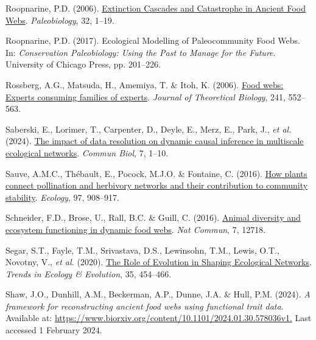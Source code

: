 \documentclass[
]{article}
\newlength{\cslhangindent}
\newenvironment{CSLReferences}[2] %
 {\begin{list}{}{%
  \setlength{\itemindent}{0pt}
  \setlength{\leftmargin}{0pt}
  \setlength{\parsep}{0pt}
  \ifodd #1
   \setlength{\leftmargin}{\cslhangindent}
   \setlength{\itemindent}{-1\cslhangindent}
  \fi
  \setlength{\itemsep}{#2\baselineskip}}}
 {\end{list}}
\begin{document}
\begin{CSLReferences}{1}{0}
Roopnarine, P.D. (2006).
\href{https://www.jstor.org/stable/4096814}{Extinction {Cascades} and
{Catastrophe} in {Ancient Food Webs}}. \emph{Paleobiology}, 32, 1--19.

Roopnarine, P.D. (2017). Ecological {Modelling} of {Paleocommunity Food
Webs}. In: \emph{Conservation {Paleobiology}: {Using} the {Past} to
{Manage} for the {Future}}. University of Chicago Press, pp. 201--226.

Rossberg, A.G., Matsuda, H., Amemiya, T. \& Itoh, K. (2006).
\href{https://doi.org/10.1016/j.jtbi.2005.12.021}{Food webs: {Experts}
consuming families of experts}. \emph{Journal of Theoretical Biology},
241, 552--563.

Saberski, E., Lorimer, T., Carpenter, D., Deyle, E., Merz, E., Park, J.,
\emph{et al.} (2024).
\href{https://doi.org/10.1038/s42003-024-07054-z}{The impact of data
resolution on dynamic causal inference in multiscale ecological
networks}. \emph{Commun Biol}, 7, 1--10.

Sauve, A.M.C., Thébault, E., Pocock, M.J.O. \& Fontaine, C. (2016).
\href{https://doi.org/10.1890/15-0132.1}{How plants connect pollination
and herbivory networks and their contribution to community stability}.
\emph{Ecology}, 97, 908--917.

Schneider, F.D., Brose, U., Rall, B.C. \& Guill, C. (2016).
\href{https://doi.org/10.1038/ncomms12718}{Animal diversity and
ecosystem functioning in dynamic food webs}. \emph{Nat Commun}, 7,
12718.

Segar, S.T., Fayle, T.M., Srivastava, D.S., Lewinsohn, T.M., Lewis,
O.T., Novotny, V., \emph{et al.} (2020).
\href{https://doi.org/10.1016/j.tree.2020.01.004}{The {Role} of
{Evolution} in {Shaping Ecological Networks}}. \emph{Trends in Ecology
\& Evolution}, 35, 454--466.

Shaw, J.O., Dunhill, A.M., Beckerman, A.P., Dunne, J.A. \& Hull, P.M.
(2024). \emph{A framework for reconstructing ancient food webs using
functional trait data}. Available at:
\href{https://www.biorxiv.org/content/10.1101/2024.01.30.578036v1}{https://www.biorxiv.org/content/10.1101/2024.01.30.578036v1.}
Last accessed 1 February 2024.


\end{CSLReferences}
\end{document}
